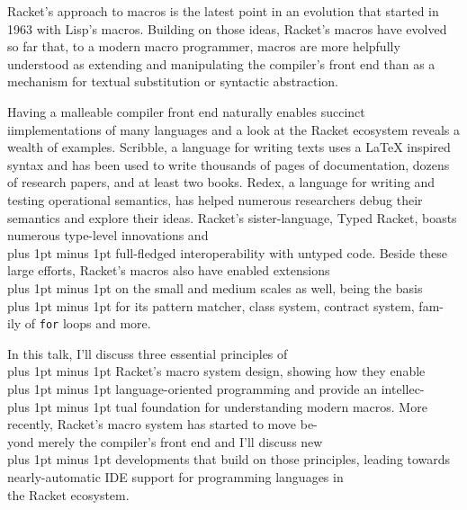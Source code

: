 \documentclass[runningheads]{llncs}
\newcommand{\MoreSpace}{\spaceskip 4pt plus 1pt minus 1pt}
\newcommand{\LittleMoreSpace}{\spaceskip 3pt plus 1pt minus 1pt}
\newcommand{\LessSpace}{\spaceskip 1.5pt plus 1pt minus 1pt}
\begin{document}
Racket's approach to macros is the latest point in an evolution that
started in 1963 with Lisp's macros. Building on those ideas, Racket's
macros have evolved so far that, to a modern macro programmer, macros
are more helpfully understood as extending and manipulating the
compiler's front end than as a mechanism for textual substitution or
syntactic abstraction.

Having a malleable compiler front end naturally enables succinct
iimplementations of many languages and a look at the Racket ecosystem
reveals a wealth of examples. Scribble, a language for writing texts
uses a \LaTeX{} inspired syntax and has been used to write thousands of
pages of documentation, dozens of research papers, and at least two
books. Redex, a language for writing and testing operational
semantics, has helped numerous researchers debug their semantics and
explore their ideas. Racket's sister-language, Typed Racket, boasts
numerous type-level innovations and\\
%
{\MoreSpace{} full-fledged interoperability with untyped code. Beside these}\\
%
large efforts, Racket's macros also have enabled extensions\\
%
{\LittleMoreSpace{} on the small and medium scales as well, being the basis}\\
%
{\LessSpace{} for its pattern matcher, class system, contract system, fam-} \\
%
ily of \texttt{for} loops and more.

In this talk, I'll discuss three essential principles of\\
%
{\LessSpace{} Racket's macro system design, showing how they enable}\\
%
{\LessSpace{} language-oriented programming and provide an intellec-}\\
%
{\LessSpace{} tual foundation for understanding modern macros. More}\\
%
recently, Racket's macro system has started to move be-\\
%
yond merely the compiler's front end and I'll discuss new\\
%
{\LessSpace{} developments that build on those principles, leading towards}\\
%
nearly-automatic IDE support for programming languages in\\ 
% 
the Racket ecosystem.
\end{document}
